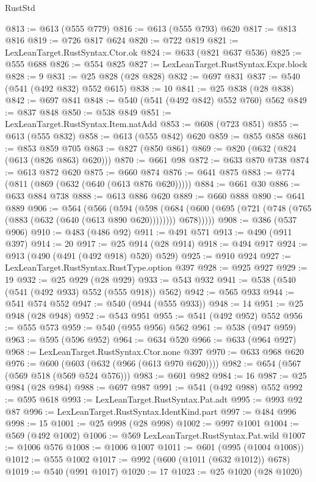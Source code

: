 \begin{lexlean}{RustStd}
\begin{coremodule}
@813 := @613 (@555 @779)
@816 := @613 (@555 @793) @620
@817 := @813 @816
@819 := @726 @817 @624
@820 := @722 @819
@821 := LexLeanTarget.RustSyntax.Ctor.ok
@824 := @633 (@821 @637 @536)
@825 := @555 @688
@826 := @554 @825
@827 := LexLeanTarget.RustSyntax.Expr.block
@828 := 9
@831 := @25 @828 (@28 @828)
@832 := @697 @831
@837 := @540 (@541 (@492 @832) @552 @615)
@838 := 10
@841 := @25 @838 (@28 @838)
@842 := @697 @841
@848 := @540 (@541 (@492 @842) @552 @760) @562
@849 := @837 @848
@850 := @538 @849
@851 := LexLeanTarget.RustSyntax.Item.natAdd
@853 := @608 (@723 @851)
@855 := @613 (@555 @832)
@858 := @613 (@555 @842) @620
@859 := @855 @858
@861 := @853 @859 @705
@863 := @827 (@850 @861)
@869 := @820 (@632 (@824 (@613 (@826 @863) @620)))
@870 := @661 @98
@872 := @633 @870 @738
@874 := @613 @872 @620
@875 := @660 @874
@876 := @641 @875
@883 := @774 (@811 (@869 (@632 (@640 (@613 @876 @620)))))
@884 := @661 @30
@886 := @633 @884 @738
@888 := @613 @886 @620
@889 := @660 @888
@890 := @641 @889
@906 := @564
    (@566
      (@594
        (@598
          (@684 (@600 (@695 (@721 (@748 (@765 (@883 (@632 (@640 (@613 @890 @620)))))))) @678)))))
@908 := @386 (@537 @906)
@910 := @483 (@486 @92)
@911 := @491 @571
@913 := @490 (@911 @397)
@914 := 20
@917 := @25 @914 (@28 @914)
@918 := @494 @917
@924 := @913 (@490 (@491 (@492 @918) @520) @529)
@925 := @910 @924
@927 := LexLeanTarget.RustSyntax.RustType.option @397
@928 := @925 @927
@929 := 19
@932 := @25 @929 (@28 @929)
@933 := @543 @932
@941 := @538 (@540 (@541 (@492 @933) @552 (@555 @918)) @562)
@942 := @565 @933
@944 := @541 @574 @552
@947 := @540 (@944 (@555 @933))
@948 := 14
@951 := @25 @948 (@28 @948)
@952 := @543 @951
@955 := @541 (@492 @952) @552
@956 := @555 @573
@959 := @540 (@955 @956) @562
@961 := @538 (@947 @959)
@963 := @595 (@596 @952)
@964 := @634 @520
@966 := @633 (@964 @927)
@968 := LexLeanTarget.RustSyntax.Ctor.none @397
@970 := @633 @968 @620
@976 := @600 (@603 (@632 (@966 (@613 @970 @620))))
@982 := @654 (@567 (@569 @518 (@569 @524 @576)))
@983 := @601 @982
@984 := 16
@987 := @25 @984 (@28 @984)
@988 := @697 @987
@991 := @541 (@492 @988) @552
@992 := @595 @618
@993 := LexLeanTarget.RustSyntax.Pat.adt
@995 := @993 @92 @87
@996 := LexLeanTarget.RustSyntax.IdentKind.part
@997 := @484 @996
@998 := 15
@1001 := @25 @998 (@28 @998)
@1002 := @997 @1001
@1004 := @569 (@492 @1002)
@1006 := @569 LexLeanTarget.RustSyntax.Pat.wild
@1007 := @1006 @576
@1008 := @1006 @1007
@1011 := @601 (@995 (@1004 @1008))
@1012 := @555 @1002
@1017 := @992 (@600 (@1011 (@632 @1012)) @678)
@1019 := @540 (@991 @1017)
@1020 := 17
@1023 := @25 @1020 (@28 @1020)

\end{coremodule}
\end{lexlean}
